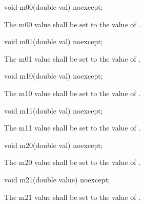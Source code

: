 \begin{itemdecl}
	void m00(double val) noexcept;
\end{itemdecl}
\begin{itemdescr}
	\pnum
	\effects
	The m00 value shall be set to the value of .
\end{itemdescr}

\begin{itemdecl}
	void m01(double val) noexcept;
\end{itemdecl}
\begin{itemdescr}
	\pnum
	\effects
	The m01 value shall be set to the value of .
\end{itemdescr}

\begin{itemdecl}
	void m10(double val) noexcept;
\end{itemdecl}
\begin{itemdescr}
	\pnum
	\effects
	The m10 value shall be set to the value of .
\end{itemdescr}

\begin{itemdecl}
	void m11(double val) noexcept;
\end{itemdecl}
\begin{itemdescr}
	\pnum
	\effects
	The m11 value shall be set to the value of .
\end{itemdescr}

\begin{itemdecl}
	void m20(double val) noexcept;
\end{itemdecl}
\begin{itemdescr}
	\pnum
	\effects
	The m20 value shall be set to the value of .
\end{itemdescr}

\begin{itemdecl}
	void m21(double value) noexcept;
\end{itemdecl}
\begin{itemdescr}
	\pnum
	\effects
	The m21 value shall be set to the value of .
\end{itemdescr}


